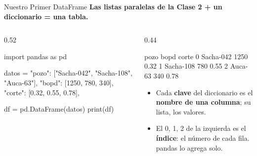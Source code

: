 \documentclass[aspectratio=169, 11pt]{beamer}
\begin{document}
\begin{frame}[fragile,shrink=15]{Nuestro Primer DataFrame}
  \vspace{-4pt}
  {\small\color{arcaDark}\bfseries
    Las listas paralelas de la Clase 2 + un diccionario = una tabla.}

  \vspace{4pt}
  \begin{columns}[T]
    \begin{column}{0.52\textwidth}
      \begin{pyblock}
import pandas as pd

datos = {
    "pozo": ["Sacha-042", "Sacha-108",
             "Auca-63"],
    "bopd": [1250, 780, 340],
    "corte": [0.32, 0.55, 0.78],
}

df = pd.DataFrame(datos)
print(df)
      \end{pyblock}
    \end{column}

    \begin{column}{0.44\textwidth}
      \begin{outputblock}
        pozo  bopd  corte
0  Sacha-042  1250   0.32
1  Sacha-108   780   0.55
2    Auca-63   340   0.78
      \end{outputblock}

      \vspace{4pt}
      {\scriptsize\color{textMuted}
      \begin{itemize}\setlength{\itemsep}{4pt}
        \item[{\color{arcaRed}\scriptsize\faArrowRight}]
          Cada \textbf{clave} del diccionario es el
          \textbf{nombre de una columna}; su lista,
          los valores.
        \item[{\color{arcaRed}\scriptsize\faArrowRight}]
          El 0, 1, 2 de la izquierda es el
          \textbf{índice}: el número de cada fila.
          pandas lo agrega solo.
      \end{itemize}
      }
    \end{column}
  \end{columns}
\end{frame}
\end{document}
